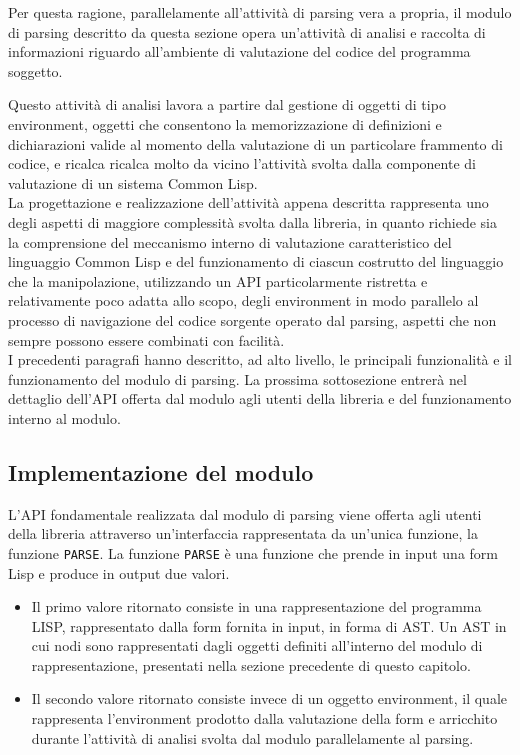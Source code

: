 Per questa ragione, parallelamente all'attività di parsing vera a propria, il
modulo di parsing descritto da questa sezione opera un'attività di analisi e
raccolta di informazioni riguardo all'ambiente di valutazione del codice del
programma soggetto.

Questo attività di analisi lavora a partire dal gestione di oggetti di tipo
environment, oggetti che consentono la memorizzazione di definizioni e
dichiarazioni valide al momento della valutazione di un particolare frammento
di codice, e ricalca ricalca molto da vicino l’attività svolta dalla
componente di valutazione di un sistema Common Lisp.\\

La progettazione e realizzazione dell'attività appena descritta rappresenta
uno degli aspetti di maggiore complessità svolta dalla libreria, in quanto
richiede sia la comprensione del meccanismo interno di valutazione
caratteristico del linguaggio Common Lisp e del funzionamento di ciascun
costrutto del linguaggio che la manipolazione, utilizzando un API
particolarmente ristretta e relativamente poco adatta allo scopo, degli
environment in modo parallelo al processo di navigazione del codice sorgente
operato dal parsing, aspetti che non sempre possono essere combinati con
facilità.\\

I precedenti paragrafi hanno descritto, ad alto livello, le principali
funzionalità e il funzionamento del modulo di parsing. La prossima
sottosezione entrerà nel dettaglio dell'API offerta dal modulo agli utenti
della libreria e del funzionamento interno al modulo.

\subsection{Implementazione del modulo}

L’API fondamentale realizzata dal modulo di parsing viene offerta agli utenti
della libreria attraverso un'interfaccia rappresentata da un’unica funzione,
la funzione \texttt{PARSE}. La funzione \texttt{PARSE} è una funzione che
prende in input una form Lisp e produce in output due valori.

\begin{itemize}

\item Il primo valore ritornato consiste in una rappresentazione del programma
LISP, rappresentato dalla form fornita in input, in forma di AST. Un AST in
cui nodi sono rappresentati dagli oggetti definiti all’interno del modulo di
rappresentazione, presentati nella sezione precedente di questo capitolo.

\item Il secondo valore ritornato consiste invece di un oggetto environment,
il quale rappresenta l’environment prodotto dalla valutazione della form e
arricchito durante l'attività di analisi svolta dal modulo parallelamente al
parsing.

\end{itemize}

